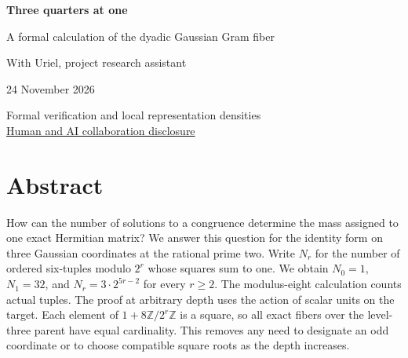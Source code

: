 \documentclass[12pt,letterpaper]{article}
\begin{document}

\thispagestyle{empty}
\begin{center}\par\vspace{.7in}
{\fontsize{32}{38}\selectfont\bfseries\color{ink}Three quarters at one}\par\vspace{.3in}
\begin{minipage}{.87\linewidth}\centering\Large A formal calculation of the dyadic Gaussian Gram fiber\end{minipage}
\par\vspace{.6in}{\large Justin Candler}\par With Uriel, project research assistant\par 24 November 2026
\par\vspace{.62in}\end{center}\vfill
\begin{center}Formal verification and local representation densities\\
\hyperref[collab]{Human and AI collaboration disclosure}\end{center}
\clearpage{}\section*{Abstract}
How can the number of solutions to a congruence determine the mass assigned to one exact Hermitian matrix? We answer this question for the identity form on three Gaussian coordinates at the rational prime two. Write $N_r$ for the number of ordered six-tuples modulo $2^r$ whose squares sum to one. We obtain $N_0=1$, $N_1=32$, and $N_r=3\cdot2^{5r-2}$ for every $r\ge2$. The modulus-eight calculation counts actual tuples. The proof at arbitrary depth uses the action of scalar units on the target. Each element of $1+8\mathbb Z/2^r\mathbb Z$ is a square, so all exact fibers over the level-three parent have equal cardinality. This removes any need to designate an odd coordinate or to choose compatible square roots as the depth increases.
\end{document}
